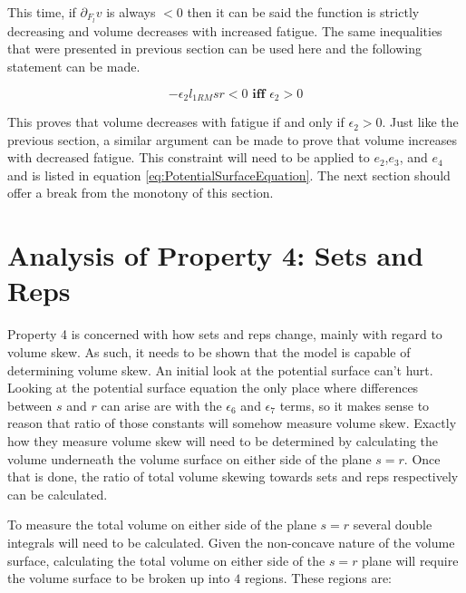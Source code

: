 This time, if $\partial_{F_l}v$ is always $<0$ then it can be said the function is strictly decreasing and volume decreases with increased fatigue. The same inequalities that were presented in previous section can be used here and the following statement can be made.

\begin{equation*}
    -\epsilon_2 l_{1RM} sr< 0 \textbf{ iff } \epsilon_2> 0
\end{equation*}

This proves that volume decreases with fatigue if and only if $\epsilon_2>0$. Just like the previous section, a similar argument can be made to prove that volume increases with decreased fatigue. This constraint will need to be applied to $e_2$,$e_3$, and $e_4$ and is listed in equation \ref{eq:PotentialSurfaceEquation}. The next section should offer a break from the monotony of this section.

\section{Analysis of Property 4: Sets and Reps}
\label{sec:PotentialSurfaceAnalysisOfProperty4}

Property 4 is concerned with how sets and reps change, mainly with regard to volume skew. As such, it needs to be shown that the model is capable of determining volume skew. An initial look at the potential surface can't hurt. Looking at the potential surface equation the only place where differences between $s$ and $r$ can arise are with the $\epsilon_6$ and $\epsilon_7$ terms, so it makes sense to reason that ratio of those constants will somehow measure volume skew. Exactly how they measure volume skew will need to be determined by calculating the volume underneath the volume surface on either side of the plane $s=r$. Once that is done, the ratio of total volume skewing towards sets and reps respectively can be calculated. 

To measure the total volume on either side of the plane $s=r$ several double integrals will need to be calculated. Given the non-concave nature of the volume surface, calculating the total volume on either side of the $s=r$ plane will require the volume surface to be broken up into $4$ regions. These regions are:

